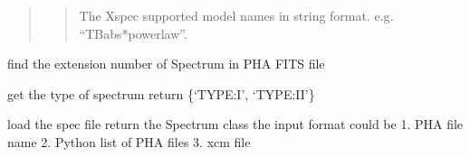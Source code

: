 \documentclass[letterpaper,10pt,english]{sphinxmanual}
\begin{document}
\begin{fulllineitems}
\begin{fulllineitems}
\begin{quote}
\begin{description}
\begin{quote}
\sphinxAtStartPar
The Xspec supported model names in string format. e.g. “TBabs*powerlaw”.
\end{quote}

\end{description}\end{quote}

\end{fulllineitems}


\end{fulllineitems}


\begin{fulllineitems}
\label{\detokenize{APIdocs/xspecanalysis:ixpetools.xspeclib.io.get_spectrum_extension}}
\sphinxAtStartPar
find the extension number of Spectrum in PHA FITS file

\end{fulllineitems}


\begin{fulllineitems}
\label{\detokenize{APIdocs/xspecanalysis:ixpetools.xspeclib.io.get_spectrum_type}}
\sphinxAtStartPar
get the type of spectrum return \{‘TYPE:I’, ‘TYPE:II’\}

\end{fulllineitems}


\begin{fulllineitems}
\label{\detokenize{APIdocs/xspecanalysis:ixpetools.xspeclib.io.loadpha}}
\sphinxAtStartPar
load the spec file return the Spectrum class
the input format could be
1. PHA file name
2. Python list of PHA files
3. xcm file

\end{fulllineitems}
\end{document}
